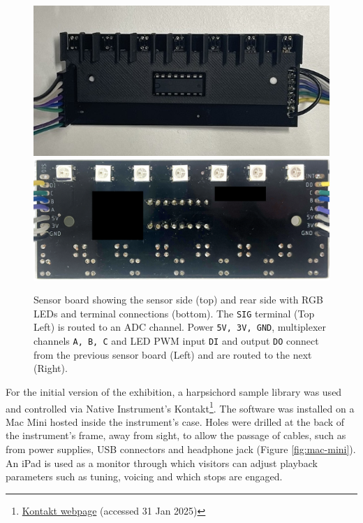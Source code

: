 \begin{figure}[!b] 
  \centering
  \includegraphics[width=\linewidth,trim={0 1.5cm 0 1.5cm},clip]{src/images/sensor-board-w-baffles.jpeg}
    \\
  \includegraphics[width=\linewidth]{src/images/sensor-board-reverse-side-anon.png} 
  \caption{Sensor board showing the sensor side (top) and rear side with RGB LEDs and terminal connections (bottom). The \texttt{SIG} terminal (Top Left) is routed to an ADC channel. Power \texttt{5V, 3V, GND}, multiplexer channels \texttt{A, B, C} and LED PWM input \texttt{DI} and output \texttt{DO}  connect from the previous sensor board (Left) and are routed to the next (Right).}
  \label{fig:sensor-reverse}
\end{figure}

For the initial version of the exhibition, a harpsichord sample library was used and controlled via Native Instrument's Kontakt\footnote{\href{https://www.native-instruments.com/en/products/komplete/samplers/kontakt-8/?srsltid=AfmBOorKUf43SoIxGBS2-GnXmKHHkgcfcfWRskpweDhLSG3FiF0qrf2w}{Kontakt webpage} (accessed 31 Jan 2025)}. The software was installed on a Mac Mini hosted inside the instrument's case. Holes were drilled at the back of the instrument's frame, away from sight, to allow the passage of cables, such as from power supplies, USB connectors and headphone jack (Figure \ref{fig:mac-mini}). 
An iPad is used as a monitor through which visitors can adjust playback parameters such as tuning, voicing and which stops are engaged. 

